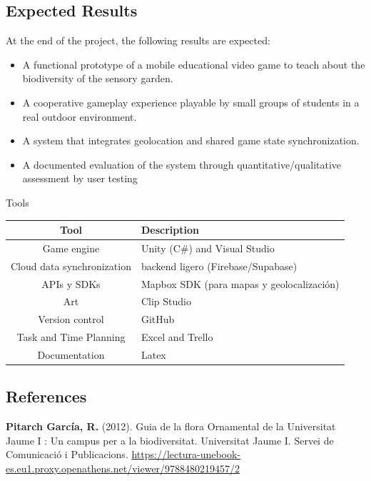 \subsection{Expected Results}
At the end of the project, the following results are expected:
\begin{itemize}
    \item A functional prototype of a mobile educational video game to teach about the biodiversity of the sensory garden.
    \item A cooperative gameplay experience playable by small groups of students in a real outdoor environment.
    \item A system that integrates geolocation and shared game state synchronization.
    \item A documented evaluation of the system through quantitative/qualitative assessment by user testing
\end{itemize}



\begin{tablebox}{Tools}
\begin{tabulary}{\linewidth}{c L}
    \textbf{Tool} & \textbf{Description} \\
    \hline
    Game engine & Unity (C\#) and Visual Studio \\
    Cloud data synchronization & backend ligero (Firebase/Supabase) \\
    APIs y SDKs & Mapbox SDK (para mapas y geolocalización) \\
    Art & Clip Studio \\
    Version control & GitHub \\
    Task and Time Planning & Excel and Trello \\
    Documentation & Latex \\
\end{tabulary}
\end{tablebox}



\subsection{References}
\textbf{Pitarch García, R.} (2012). Guia de la flora Ornamental de la Universitat Jaume I : Un campus per a la biodiversitat. Universitat Jaume I. Servei de Comunicació i Publicacions. \url{https://lectura-unebook-es.eu1.proxy.openathens.net/viewer/9788480219457/2}

